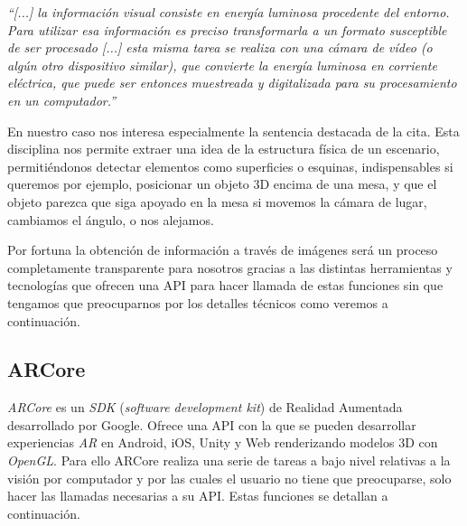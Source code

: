    \textit{``[...] la información visual consiste en energía luminosa procedente del entorno. Para utilizar esa información es preciso transformarla a un formato susceptible de ser procesado [...] esta misma tarea se realiza con una cámara de vídeo (o algún otro dispositivo similar), que convierte la energía luminosa en corriente eléctrica, que puede ser entonces muestreada y digitalizada para su procesamiento en un computador.''}

En nuestro caso nos interesa especialmente la sentencia destacada de la cita. Esta disciplina nos permite extraer una idea de la estructura física de un escenario, permitiéndonos detectar elementos como superficies o esquinas, indispensables si queremos por ejemplo, posicionar un objeto 3D encima de una mesa, y que el objeto parezca que siga apoyado en la mesa si movemos la cámara de lugar, cambiamos el ángulo, o nos alejamos.

Por fortuna la obtención de información a través de imágenes será un proceso completamente transparente para nosotros gracias a las distintas herramientas y tecnologías que ofrecen una API para hacer llamada de estas funciones sin que tengamos que preocuparnos por los detalles técnicos como veremos a continuación.

\subsection{ARCore}
\textit{ARCore}\cite{arcore}  es un \textit{SDK} (\textit{software development kit}) de Realidad Aumentada desarrollado por Google. Ofrece una API con la que se pueden desarrollar experiencias \textit{AR} en Android, iOS, Unity y Web renderizando modelos 3D con \textit{OpenGL}. Para ello ARCore realiza una serie de tareas a bajo nivel relativas a la visión por computador y por las cuales el usuario no tiene que preocuparse, solo hacer las llamadas necesarias a su API. Estas funciones se detallan a continuación.

